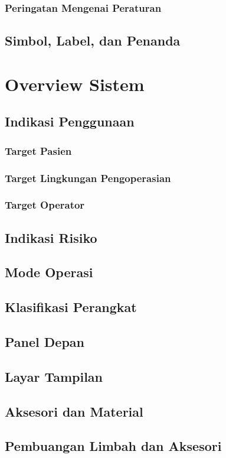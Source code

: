 \documentclass[11pt,a4paper,twoside,draft,onecolumn]{book}
\begin{document}
			\subsection{Peringatan Mengenai Peraturan}
		\section{Simbol, Label, dan Penanda}
	\newpage
	
	\chapter{Overview Sistem}
		\section{Indikasi Penggunaan}
			\subsection{Target Pasien}
			\subsection{Target Lingkungan Pengoperasian}
			\subsection{Target Operator}
		\section{Indikasi Risiko}
		\section{Mode Operasi}
		\section{Klasifikasi Perangkat}
		\section{Panel Depan}
		\section{Layar Tampilan}
		\section{Aksesori dan Material}
		\section{Pembuangan Limbah dan Aksesori}
	\newpage
	
\end{document}
